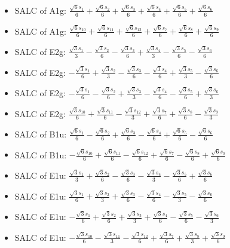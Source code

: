 \documentclass[12pt,a4paper]{article}
\begin{document}
\begin{itemize}
\item SALC of A1g: \quad $\frac{\sqrt{6} s_{1}}{6} + \frac{\sqrt{6} s_{2}}{6} + \frac{\sqrt{6} s_{3}}{6} + \frac{\sqrt{6} s_{4}}{6} + \frac{\sqrt{6} s_{5}}{6} + \frac{\sqrt{6} s_{6}}{6}$
\item SALC of A1g: \quad $\frac{\sqrt{6} s_{10}}{6} + \frac{\sqrt{6} s_{11}}{6} + \frac{\sqrt{6} s_{12}}{6} + \frac{\sqrt{6} s_{7}}{6} + \frac{\sqrt{6} s_{8}}{6} + \frac{\sqrt{6} s_{9}}{6}$
\item SALC of E2g: \quad $\frac{\sqrt{3} s_{1}}{3} - \frac{\sqrt{3} s_{2}}{6} - \frac{\sqrt{3} s_{3}}{6} + \frac{\sqrt{3} s_{4}}{3} - \frac{\sqrt{3} s_{5}}{6} - \frac{\sqrt{3} s_{6}}{6}$
\item SALC of E2g: \quad $- \frac{\sqrt{3} s_{1}}{6} + \frac{\sqrt{3} s_{2}}{3} - \frac{\sqrt{3} s_{3}}{6} - \frac{\sqrt{3} s_{4}}{6} + \frac{\sqrt{3} s_{5}}{3} - \frac{\sqrt{3} s_{6}}{6}$
\item SALC of E2g: \quad $- \frac{\sqrt{3} s_{1}}{6} - \frac{\sqrt{3} s_{2}}{6} + \frac{\sqrt{3} s_{3}}{3} - \frac{\sqrt{3} s_{4}}{6} - \frac{\sqrt{3} s_{5}}{6} + \frac{\sqrt{3} s_{6}}{3}$
\item SALC of E2g: \quad $\frac{\sqrt{3} s_{10}}{6} + \frac{\sqrt{3} s_{11}}{6} - \frac{\sqrt{3} s_{12}}{3} + \frac{\sqrt{3} s_{7}}{6} + \frac{\sqrt{3} s_{8}}{6} - \frac{\sqrt{3} s_{9}}{3}$
\item SALC of B1u: \quad $\frac{\sqrt{6} s_{1}}{6} - \frac{\sqrt{6} s_{2}}{6} + \frac{\sqrt{6} s_{3}}{6} - \frac{\sqrt{6} s_{4}}{6} + \frac{\sqrt{6} s_{5}}{6} - \frac{\sqrt{6} s_{6}}{6}$
\item SALC of B1u: \quad $- \frac{\sqrt{6} s_{10}}{6} + \frac{\sqrt{6} s_{11}}{6} - \frac{\sqrt{6} s_{12}}{6} + \frac{\sqrt{6} s_{7}}{6} - \frac{\sqrt{6} s_{8}}{6} + \frac{\sqrt{6} s_{9}}{6}$
\item SALC of E1u: \quad $\frac{\sqrt{3} s_{1}}{3} + \frac{\sqrt{3} s_{2}}{6} - \frac{\sqrt{3} s_{3}}{6} - \frac{\sqrt{3} s_{4}}{3} - \frac{\sqrt{3} s_{5}}{6} + \frac{\sqrt{3} s_{6}}{6}$
\item SALC of E1u: \quad $\frac{\sqrt{3} s_{1}}{6} + \frac{\sqrt{3} s_{2}}{3} + \frac{\sqrt{3} s_{3}}{6} - \frac{\sqrt{3} s_{4}}{6} - \frac{\sqrt{3} s_{5}}{3} - \frac{\sqrt{3} s_{6}}{6}$
\item SALC of E1u: \quad $- \frac{\sqrt{3} s_{1}}{6} + \frac{\sqrt{3} s_{2}}{6} + \frac{\sqrt{3} s_{3}}{3} + \frac{\sqrt{3} s_{4}}{6} - \frac{\sqrt{3} s_{5}}{6} - \frac{\sqrt{3} s_{6}}{3}$
\item SALC of E1u: \quad $- \frac{\sqrt{3} s_{10}}{6} - \frac{\sqrt{3} s_{11}}{3} - \frac{\sqrt{3} s_{12}}{6} + \frac{\sqrt{3} s_{7}}{6} + \frac{\sqrt{3} s_{8}}{3} + \frac{\sqrt{3} s_{9}}{6}$
\end{itemize}
\end{document}
